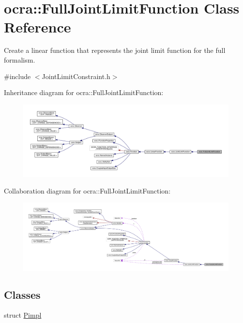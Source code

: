 \hypertarget{classocra_1_1FullJointLimitFunction}{}\section{ocra\+:\+:Full\+Joint\+Limit\+Function Class Reference}
\label{classocra_1_1FullJointLimitFunction}


Create a linear function that represents the joint limit function for the full formalism.  




{\ttfamily \#include $<$Joint\+Limit\+Constraint.\+h$>$}



Inheritance diagram for ocra\+:\+:Full\+Joint\+Limit\+Function\+:\nopagebreak
\begin{figure}[H]
\begin{center}
\leavevmode
\includegraphics[width=350pt]{df/d87/classocra_1_1FullJointLimitFunction__inherit__graph}
\end{center}
\end{figure}


Collaboration diagram for ocra\+:\+:Full\+Joint\+Limit\+Function\+:\nopagebreak
\begin{figure}[H]
\begin{center}
\leavevmode
\includegraphics[width=350pt]{db/d17/classocra_1_1FullJointLimitFunction__coll__graph}
\end{center}
\end{figure}
\subsection*{Classes}
\begin{DoxyCompactItemize}
\item 
struct \hyperlink{structFullJointLimitFunction_1_1Pimpl}{Pimpl}
\end{DoxyCompactItemize}
